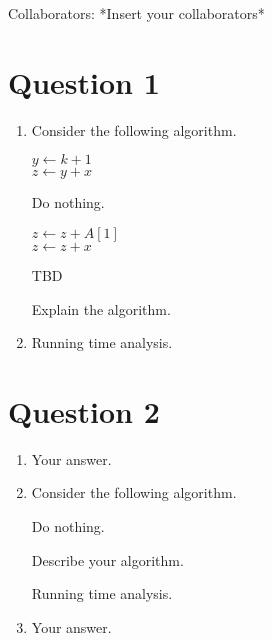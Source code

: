 \documentclass[11pt,letterpaper]{article}
\newcommand\collaborators{*Insert your collaborators*}
\begin{document}
Collaborators: \collaborators

\section*{Question 1}

\begin{enumerate}[label=(\alph*)]
  \item Consider the following algorithm.

  \begin{minipage}{\linewidth}
    \begin{algorithm}[H]

      \BlankLine
      
      $y \gets k + 1$\\
      $z \gets y + x$ 

       {
      }

       {
        Do nothing.
      }

       {
        $z \gets z + A[1]$\\
        $z \gets z + x$
      }

      \BlankLine
      \KwRet \yes
      \caption{TBD}
    \end{algorithm}
  \end{minipage}

Explain the algorithm.

  \item Running time analysis.
\end{enumerate}

\pagebreak
\section*{Question 2}

\begin{enumerate}[label=(\alph*)]
  \item Your answer.
  \item Consider the following algorithm.

  \begin{minipage}{\linewidth}
    \begin{algorithm}[H]
    
      \BlankLine
      Do nothing.

      \caption{Describe your algorithm.}
    \end{algorithm}
  \end{minipage}
    
  Running time analysis.

  \item Your answer.
\end{enumerate}
\end{document}
